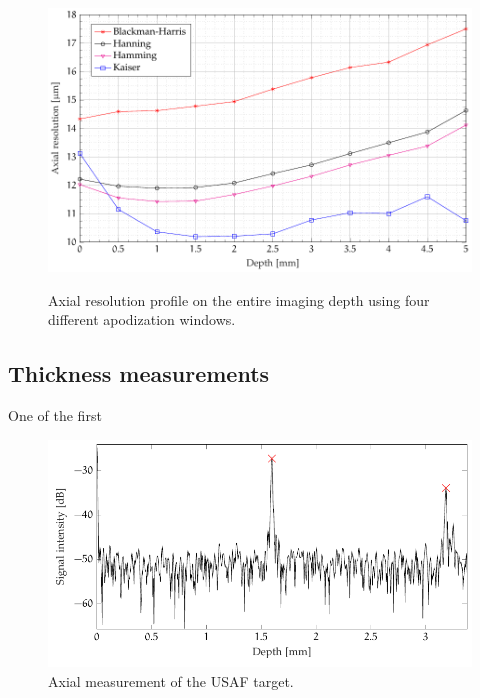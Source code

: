 \begin{figure}[hbt]
	{\myfloatalign
		\includegraphics[width=\linewidth]{gfx/ch3/risoluzione-profondita}}
	\caption{Axial resolution profile on the entire imaging depth using four different apodization windows.}\label{fig:axial-resolution-depth}
\end{figure}


\subsection{Thickness measurements}
One of the first 

\begin{figure}[hbt]
	\myfloatalign
	\includegraphics[width=\linewidth]{gfx/tikz/thickness-measure/target-thickness}
	\caption{Axial measurement of the USAF target.}\label{fig:target-thickness}
\end{figure}

